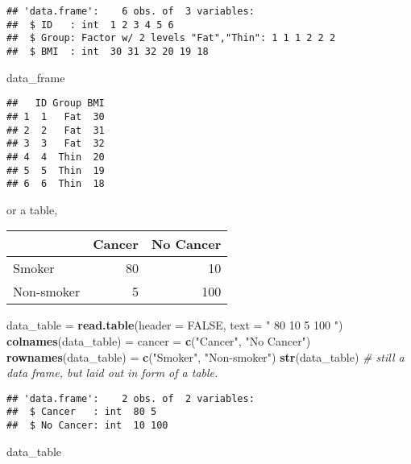 \documentclass[]{book}
\newenvironment{Shaded}{\begin{snugshade}}{\end{snugshade}}
\newcommand{\KeywordTok}[1]{\textcolor[rgb]{0.13,0.29,0.53}{\textbf{{#1}}}}
\newcommand{\DataTypeTok}[1]{\textcolor[rgb]{0.13,0.29,0.53}{{#1}}}
\newcommand{\StringTok}[1]{\textcolor[rgb]{0.31,0.60,0.02}{{#1}}}
\newcommand{\CommentTok}[1]{\textcolor[rgb]{0.56,0.35,0.01}{\textit{{#1}}}}
\newcommand{\OtherTok}[1]{\textcolor[rgb]{0.56,0.35,0.01}{{#1}}}
\newcommand{\NormalTok}[1]{{#1}}
\theoremstyle{definition}
\theoremstyle{definition}
\theoremstyle{remark}
\begin{document}
\begin{verbatim}
## 'data.frame':    6 obs. of  3 variables:
##  $ ID   : int  1 2 3 4 5 6
##  $ Group: Factor w/ 2 levels "Fat","Thin": 1 1 1 2 2 2
##  $ BMI  : int  30 31 32 20 19 18
\end{verbatim}

\begin{Shaded}
\begin{Highlighting}[]
\NormalTok{data_frame}
\end{Highlighting}
\end{Shaded}

\begin{verbatim}
##   ID Group BMI
## 1  1   Fat  30
## 2  2   Fat  31
## 3  3   Fat  32
## 4  4  Thin  20
## 5  5  Thin  19
## 6  6  Thin  18
\end{verbatim}

or a table,

\begin{longtable}[]{@{}lrr@{}}
\toprule
& Cancer & No Cancer\tabularnewline
\midrule
\endhead
Smoker & 80 & 10\tabularnewline
Non-smoker & 5 & 100\tabularnewline
\bottomrule
\end{longtable}

\begin{Shaded}
\begin{Highlighting}[]
\NormalTok{data_table =}\StringTok{ }\KeywordTok{read.table}\NormalTok{(}\DataTypeTok{header =} \OtherTok{FALSE}\NormalTok{, }\DataTypeTok{text =} \StringTok{"}
\StringTok{80 10}
\StringTok{5 100}
\StringTok{                        "}\NormalTok{)}
\KeywordTok{colnames}\NormalTok{(data_table) =}\StringTok{ }\NormalTok{cancer =}\StringTok{ }\KeywordTok{c}\NormalTok{(}\StringTok{"Cancer"}\NormalTok{, }\StringTok{"No Cancer"}\NormalTok{)}
\KeywordTok{rownames}\NormalTok{(data_table) =}\StringTok{ }\KeywordTok{c}\NormalTok{(}\StringTok{"Smoker"}\NormalTok{, }\StringTok{"Non-smoker"}\NormalTok{)}
\KeywordTok{str}\NormalTok{(data_table)  }\CommentTok{# still a data frame, but laid out in form of a table.}
\end{Highlighting}
\end{Shaded}

\begin{verbatim}
## 'data.frame':    2 obs. of  2 variables:
##  $ Cancer   : int  80 5
##  $ No Cancer: int  10 100
\end{verbatim}

\begin{Shaded}
\begin{Highlighting}[]
\NormalTok{data_table}
\end{Highlighting}
\end{Shaded}
\end{document}
